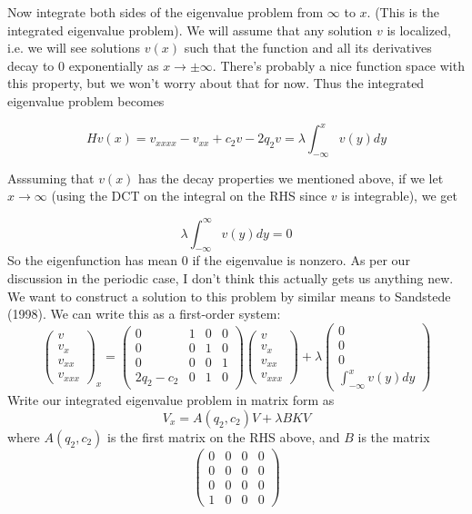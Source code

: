 \documentclass[12pt]{article}
\begin{document}
Now integrate both sides of the eigenvalue problem from $\infty$ to $x$. (This is the integrated eigenvalue problem). We will assume that any solution $v$ is localized, i.e. we will see solutions $v(x)$ such that the function and all its derivatives decay to 0 exponentially as $x \rightarrow \pm \infty$. There's probably a nice function space with this property, but we won't worry about that for now. Thus the integrated eigenvalue problem becomes

\begin{equation}\label{inteigproblem}
Hv(x) = v_{xxxx} - v_{xx} + c_2 v - 2 q_2 v = \lambda \int_{-\infty}^x v(y) dy
\end{equation}

Asssuming that $v(x)$ has the decay properties we mentioned above, if we let $x \rightarrow \infty$ (using the DCT on the integral on the RHS since $v$ is integrable), we get

\[
\lambda \int_{-\infty}^\infty v(y) dy = 0
\]
So the eigenfunction has mean 0 if the eigenvalue is nonzero. As per our discussion in the periodic case, I don't think this actually gets us anything new.\\


We want to construct a solution to this problem by similar means to Sandstede (1998). We can write this as a first-order system:
\[
\begin{pmatrix}v\\v_x\\v_{xx}\\v_{xxx}\end{pmatrix}_x = 
\begin{pmatrix}0 & 1 & 0 & 0 \\ 0 & 0 & 1 & 0 \\ 0 & 0 & 0 & 1 \\ 2q_2 - c_2 & 0 & 1 & 0\end{pmatrix}
\begin{pmatrix}v\\v_x\\v_{xx}\\v_{xxx}\end{pmatrix} + \lambda
\begin{pmatrix}0\\0\\0\\\int_{-\infty}^x v(y) dy\end{pmatrix}
\]
Write our integrated eigenvalue problem in matrix form as
\[
V_x = A(q_2, c_2)V + \lambda B K V
\]
where $A(q_2, c_2)$ is the first matrix on the RHS above, and $B$ is the matrix
\[
\begin{pmatrix}0 & 0 & 0 & 0 \\0 & 0 & 0 & 0 \\0 & 0 & 0 & 0 \\1 & 0 & 0 & 0 \end{pmatrix}
\]
\end{document}
